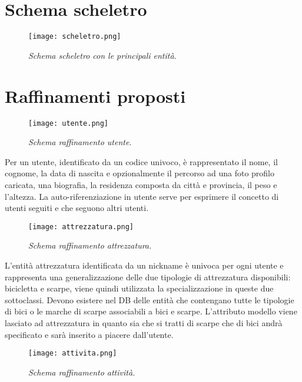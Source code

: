 \documentclass[12pt]{report}
\begin{document}
\section{Schema scheletro}

\begin{figure}[H]
    \texttt{[image: scheletro.png]}
    \centering
    \caption{\emph{Schema scheletro con le principali entità.}}
    \label{img:schema_scheletro}
\end{figure}

\section{Raffinamenti proposti}

\begin{figure}[H]
    \texttt{[image: utente.png]}
    \centering
    \caption{\emph{Schema raffinamento utente.}}
    \label{img:schema_utente}
\end{figure}

Per un utente, identificato da un codice univoco, è rappresentato il nome, il cognome,
la data di nascita e opzionalmente il percorso ad una foto profilo caricata, una biografia,
la residenza composta da città e provincia, il peso e l'altezza.
La auto-riferenziazione in utente serve per esprimere il concetto di utenti seguiti e che seguono altri utenti.

\begin{figure}[H]
    \texttt{[image: attrezzatura.png]}
    \centering
    \caption{\emph{Schema raffinamento attrezzatura.}}
    \label{img:schema_attrezzatura}
\end{figure}

L'entità attrezzatura identificata da un nickname è univoca per ogni utente e rappresenta una generalizzazione delle due tipologie 
di attrezzatura disponibili: bicicletta e scarpe, viene quindi utilizzata la specializzazione in queste due sottoclassi. 
Devono esistere nel DB delle entità che contengano tutte le tipologie di bici o le marche di scarpe associabili a bici 
e scarpe. L'attributo modello viene lasciato ad attrezzatura in quanto sia che si tratti di scarpe che di bici andrà specificato
e sarà inserito a piacere dall'utente.

\begin{figure}[H]
    \texttt{[image: attivita.png]}
    \centering
    \caption{\emph{Schema raffinamento attività.}}
    \label{img:schema_attivita}
\end{figure}
\end{document}

